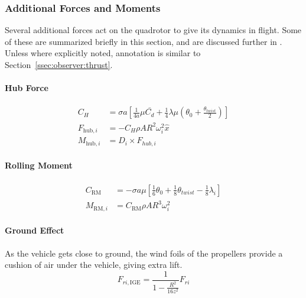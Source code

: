 \subsubsection{Additional Forces and Moments}
\label{ssec:observer:additionalforces}
    Several additional forces act on the quadrotor to give its dynamics in flight.
    Some of these are summarized briefly in this section, and are discussed further in \citep{bouabdallah07full}.
    Unless where explicitly noted, annotation is similar to Section~\ref{ssec:observer:thrust}.
    \paragraph{Hub Force}
        \begin{align}
            C_{H} &= \sigma a \left[
                \frac{1}{4a}\mu\bar{C_{d}}
                + \frac{1}{4}\lambda\mu\left( \theta_{0} + \frac{\theta_{twist}}{2} \right)
                \right] \\
%
            F_{\text{hub},i} &= -C_{H} \rho A R^{2} \omega_{i}^{2}\hat{x} \\
%
            M_{\text{hub},i} &= D_{i} \times F_{hub,i}
        \end{align}

    \paragraph{Rolling Moment}
        \begin{align}
            C_{\text{RM}} &= - \sigma a \mu \left[
                \frac{1}{6}\theta_{0}
                + \frac{1}{8}\theta_{twist}
                - \frac{1}{8}\lambda_{i}
                \right] \\
%
            M_{\text{RM},i} &= C_{\text{RM}} \rho A R^{3} \omega_{i}^{2}
        \end{align}

    \paragraph{Ground Effect}
        As the vehicle gets close to ground, the wind foils of the propellers
        provide a cushion of air under the vehicle, giving extra lift.
        \begin{equation}
            F_{ri,\text{IGE}} = \frac{1}{1-\frac{R^{2}}{16z^{2}}} F_{ri}
        \end{equation}

